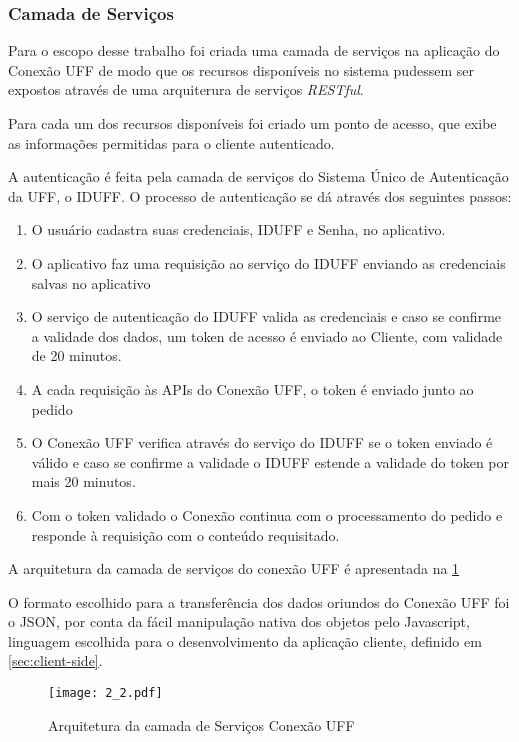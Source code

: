 \subsubsection{Camada de Serviços}

Para o escopo desse trabalho foi criada uma camada de serviços na aplicação do Conexão UFF de modo que os recursos disponíveis no sistema pudessem ser expostos através de uma arquiterura de serviços \textit{RESTful}.

Para cada um dos recursos disponíveis foi criado um ponto de acesso, que exibe as informações permitidas para o cliente autenticado.

A autenticação é feita pela camada de serviços do Sistema Único de Autenticação da UFF, o IDUFF. O processo de autenticação se dá através dos seguintes passos:

\begin{enumerate}
    \item O usuário cadastra suas credenciais, IDUFF e Senha, no aplicativo.
    \item O aplicativo faz uma requisição ao serviço do IDUFF enviando as credenciais salvas no aplicativo
    \item O serviço de autenticação do IDUFF valida as credenciais e caso se confirme a validade dos dados, um token de acesso é enviado ao Cliente, com validade de 20 minutos.
    \item A cada requisição às APIs do Conexão UFF, o token é enviado junto ao pedido
    \item O Conexão UFF verifica através do serviço do IDUFF se o token enviado é válido e caso se confirme a validade o IDUFF estende a validade do token por mais 20 minutos.
    \item Com o token validado o Conexão continua com o processamento do pedido e responde à requisição com o conteúdo requisitado.
\end{enumerate}

A arquitetura da camada de serviços do conexão UFF é apresentada na \ref{conexao-arq}

O formato escolhido para a transferência dos dados oriundos do Conexão UFF foi o JSON, por conta da fácil manipulação nativa dos objetos pelo Javascript, linguagem escolhida para o desenvolvimento da aplicação cliente, definido em \ref{sec:client-side}.


\begin{figure}[H]
\centering
\texttt{[image: 2\_2.pdf]}
    \caption{Arquitetura da camada de Serviços Conexão UFF}
    \label{conexao-arq}%
\end{figure}




